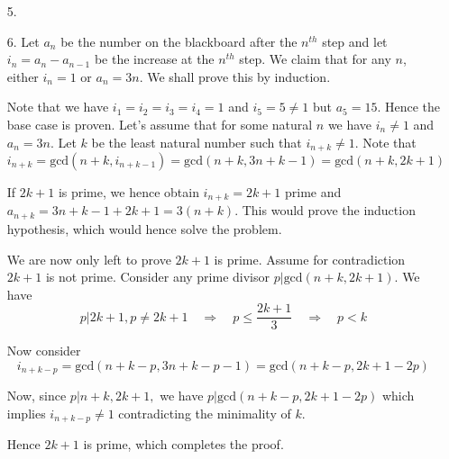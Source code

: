 \documentclass[a4paper, 12pt]{article}
\begin{document}
\begin{enumerate}
    
    \item[5.] 
    
    
    \item[6.] Let $a_n$ be the number on the blackboard after the $n^{th}$ step and let $i_n = a_n - a_{n-1}$ be the increase at the $n^{th}$ step. We claim that for any $n$, either $i_n = 1$ or $a_n = 3n$. We shall prove this by induction.
    
    Note that we have $i_1=i_2=i_3=i_4=1$ and $i_5=5\neq 1$ but $a_5=15$. Hence the base case is proven. Let's assume that for some natural $n$ we have $i_n\neq 1$ and $a_n=3n$. Let $k$ be the least natural number such that $i_{n+k}\neq 1$. Note that
    $$ i_{n+k}=\textrm{gcd}(n+k, i_{n+k-1})=\textrm{gcd}(n+k, 3n+k-1)=\textrm{gcd}(n+k, 2k+1) $$
    
    If $2k+1$ is prime, we hence obtain $i_{n+k}=2k+1$ prime and $a_{n+k}=3n+k-1+2k+1=3(n+k)$. This would prove the induction hypothesis, which would hence solve the problem.
    
    We are now only left to prove $2k+1$ is prime. Assume for contradiction $2k+1$ is not prime. Consider any prime divisor $p|\textrm{gcd}(n+k, 2k+1)$. We have
     $$ p|2k+1, p\neq 2k+1 \quad \Longrightarrow \quad p \leq \frac{2k+1}{3} \quad \Longrightarrow \quad p<k $$
     
     Now consider
     $$ i_{n+k-p}=\textrm{gcd}(n+k-p, 3n+k-p-1)=\textrm{gcd}(n+k-p, 2k+1-2p) $$
     
     Now, since $p|n+k, 2k+1,$ we have $p|\textrm{gcd}(n+k-p, 2k+1-2p)$ which implies $ i_{n+k-p} \neq 1$ contradicting the minimality of $k$.
     
     Hence $2k+1$ is prime, which completes the proof.
    
    
\end{enumerate}


\centering
\begin{BVerbatim}
\end{BVerbatim}
\end{document}
